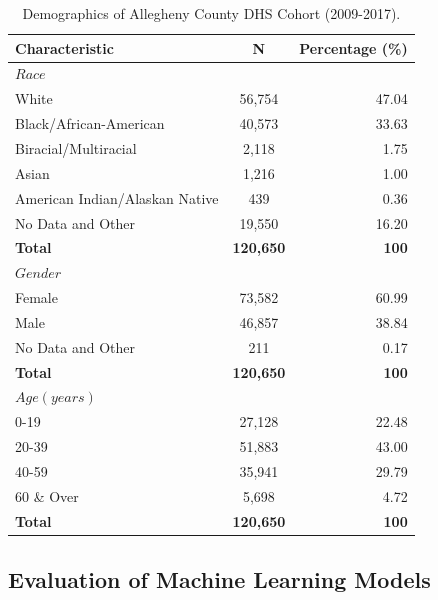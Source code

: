 \documentclass[twoside,10.5pt]{article}
\begin{document}
\begin{table}[h!]
  \begin{center}
    \caption{Demographics of Allegheny County DHS Cohort (2009-2017).}
    \label{tab:table1}
    \begin{tabular}{l|c|r} %
      \textbf{Characteristic} & \textbf{N} & \textbf{Percentage (\%)}\\
      \hline
      $Race$ & $ $ & $ $ \\
      White & 56,754 & 47.04\\
      Black/African-American & 40,573 & 33.63\\
      Biracial/Multiracial & 2,118 & 1.75\\
      Asian & 1,216 & 1.00\\
      American Indian/Alaskan Native & 439 & 0.36\\
      No Data and Other & 19,550 & 16.20\\
      \textbf{Total} & \textbf{120,650} & \textbf{100}\\
      \hline
      $Gender$ & $ $ & $ $ \\
      Female & 73,582 & 60.99\\
      Male & 46,857 & 38.84\\
      No Data and Other & 211 & 0.17\\
      \textbf{Total} & \textbf{120,650} & \textbf{100}\\
      \hline
      $Age (years)$ & $ $ & $ $\\
      0-19 & 27,128 & 22.48\\
      20-39 & 51,883 & 43.00\\
      40-59 & 35,941 &  29.79\\
      60 \& Over & 5,698 &   4.72\\
      \textbf{Total} & \textbf{120,650} & \textbf{100}\\
      \hline
    \end{tabular}
  \end{center}
\end{table}


\subsection{Evaluation of Machine Learning Models}
\end{document}
